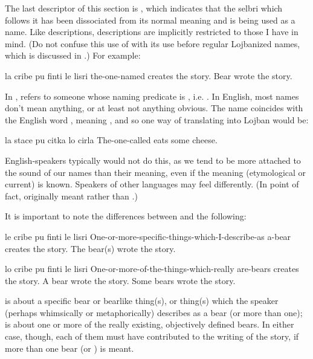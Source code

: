 The last descriptor of this section is , which
    indicates that the selbri which follows it has been dissociated
    from its normal meaning and is being used as a name. Like
     descriptions,  descriptions are implicitly
    restricted to those I have in mind. (Do not confuse this use of
     with its use before regular Lojbanized names, which is
    discussed in .) For example:
\begin{example}
la cribe pu finti le lisri\n
the-one-named   creates the story.\n
Bear wrote the story.
\end{example}

In ,  refers to
    someone whose naming predicate is , i.e. . In
    English, most names don't mean anything, or at least not
    anything obvious. The name  coincides with the English
    word , meaning , and so one way of
    translating  into Lojban would be:
\begin{example}
la stace pu citka lo cirla\n
The-one-called   eats some cheese.
\end{example}

English-speakers typically would not do this, as we tend to
    be more attached to the sound of our names than their meaning,
    even if the meaning (etymological or current) is known.
    Speakers of other languages may feel differently. (In point of
    fact,  originally meant  rather than
    .)

It is important to note the differences between  and the following:
\begin{example}
le cribe pu finti le lisri\n
One-or-more-specific-things-which-I-describe-as a-bear\n
\T	{} creates the story.\n
The bear(s) wrote the story.
\end{example}

\begin{example}
lo cribe pu finti le lisri\n
One-or-more-of-the-things-which-really are-bears\n
\T	{} creates the story.\n
A bear wrote the story.\n
Some bears wrote the story.
\end{example}

 is about a specific bear or
    bearlike thing(s), or thing(s) which the speaker (perhaps
    whimsically or metaphorically) describes as a bear (or more
    than one);  is about one or more
    of the really existing, objectively defined bears. In either
    case, though, each of them must have contributed to the writing
    of the story, if more than one bear (or ) is meant. 

